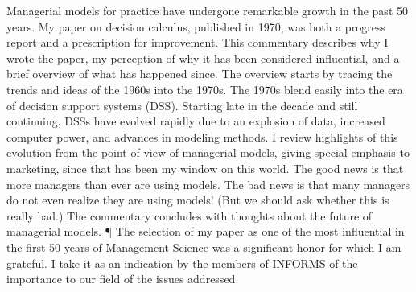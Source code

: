 Managerial models for practice have undergone remarkable growth in the past 50 years. My paper on decision calculus, published in 1970, was both a progress report and a prescription for improvement. This commentary describes why I wrote the paper, my perception of why it has been considered influential, and a brief overview of what has happened since. The overview starts by tracing the trends and ideas of the 1960s into the 1970s. The 1970s blend easily into the era of decision support systems (DSS). Starting late in the decade and still continuing, DSSs have evolved rapidly due to an explosion of data, increased computer power, and advances in modeling methods. I review highlights of this evolution from the point of view of managerial models, giving special emphasis to marketing, since that has been my window on this world. The good news is that more managers than ever are using models. The bad news is that many managers do not even realize they are using models! (But we should ask whether this is really bad.) The commentary concludes with thoughts about the future of managerial models. ¶ The selection of my paper as one of the most influential in the first 50 years of Management Science was a significant honor for which I am grateful. I take it as an indication by the members of INFORMS of the importance to our field of the issues addressed.

